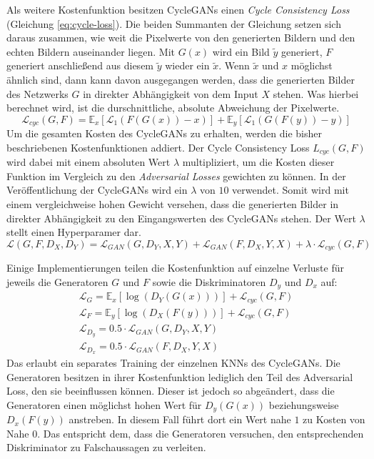 Als weitere Kostenfunktion besitzen \acp{CycleGAN} einen \emph{Cycle Consistency Loss} (Gleichung \ref{eq:cycle-loss}). Die beiden Summanten der Gleichung setzen sich daraus zusammen, wie weit die Pixelwerte von den generierten Bildern und den echten Bildern auseinander liegen. Mit $G(x)$ wird ein Bild $\tilde{y}$ generiert, $F$ generiert anschließend aus diesem $\tilde{y}$ wieder ein $\tilde{x}$. Wenn $\tilde{x}$ und $x$ möglichst ähnlich sind, dann kann davon ausgegangen werden, dass die generierten Bilder des Netzwerks $G$ in direkter Abhängigkeit von dem Input $X$ stehen. Was hierbei berechnet wird, ist die durschnittliche, absolute Abweichung der Pixelwerte. \cite{cycleGAN}
\begin{equation}
   \label{eq:cycle-loss}
	\mathcal{L}_{cyc}(G, F) = \mathbb{E}_x[\mathcal{L}_{1}(F(G(x))-x)] + \mathbb{E}_y[\mathcal{L}_{1}(G(F(y))-y)]
\end{equation}
Um die gesamten Kosten des \acp{CycleGAN} zu erhalten, werden die bisher beschriebenen Kostenfunktionen addiert. Der Cycle Consistency Loss $L_{cyc}(G, F)$ wird dabei mit einem absoluten Wert $\lambda$ multipliziert, um die Kosten dieser Funktion im Vergleich zu den \emph{Adversarial Losses} gewichten zu können. In der Veröffentlichung der \acp{CycleGAN} wird ein $\lambda$ von $10$ verwendet. Somit wird mit einem vergleichweise hohen Gewicht versehen, dass die generierten Bilder in direkter Abhängigkeit zu den Eingangswerten des \acp{CycleGAN} stehen. Der Wert $\lambda$ stellt einen Hyperparamer dar. \cite{cycleGAN}
\begin{equation}
	\mathcal{L}(G, F, D_X, D_Y) = \mathcal{L}_{GAN}(G, D_Y, X, Y) + \mathcal{L}_{GAN}(F, D_X, Y, X) + \lambda \cdot \mathcal{L}_{cyc}(G, F)
\end{equation}
\cite{cycleGAN}

Einige Implementierungen teilen die Kostenfunktion auf einzelne Verluste für jeweils die Generatoren $G$ und $F$ sowie die Diskriminatoren $D_y$ und $D_x$ auf: \cite{cyclegan-tutorial} \cite{cyclegan-resnet}
\begin{subequations}
   \label{eq:cyclegan-losses}
   \begin{align}
      \mathcal{L}_G = \mathbb{E}_x [\log(D_Y(G(x)))] + \mathcal{L}_{cyc}(G, F) \\ 
      \mathcal{L}_F = \mathbb{E}_y [\log(D_X(F(y)))] + \mathcal{L}_{cyc}(G, F) \\
      \mathcal{L}_{D_y} = 0.5 \cdot \mathcal{L}_{GAN}(G, D_Y, X, Y) \\
      \mathcal{L}_{D_x} = 0.5 \cdot \mathcal{L}_{GAN}(F, D_X, Y, X)
\end{align}
\end{subequations}
Das erlaubt ein separates Training der einzelnen \acp{KNN} des \acp{CycleGAN}. Die Generatoren besitzen in ihrer Kostenfunktion lediglich den Teil des Adversarial Loss, den sie beeinflussen können. Dieser ist jedoch so abgeändert, dass die Generatoren einen möglichst hohen Wert für $D_y(G(x))$ beziehungsweise $D_x(F(y))$ anstreben. In diesem Fall führt dort ein Wert nahe $1$ zu Kosten von Nahe $0$. Das entspricht dem, dass die Generatoren versuchen, den entsprechenden Diskriminator zu Falschaussagen zu verleiten.
 

